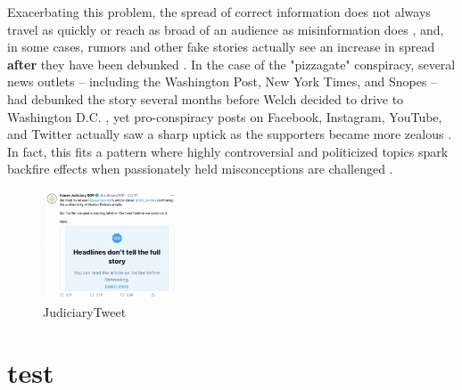 \documentclass[NETN,manuscript]{stjour-new}
\begin{document}
Exacerbating this problem, the spread of correct information does not always travel as quickly or reach as broad of an audience as misinformation does \citep{maddock2015characterizing, vosoughi2018spread}, and, in some cases, rumors and other fake stories actually see an increase in spread \textbf{after} they have been debunked \citep{starbird2014rumors}. In the case of the "pizzagate" conspiracy, several news outlets -- including the Washington Post, New York Times, and Snopes -- had debunked the story several months before Welch decided to drive to Washington D.C. \citep{kang2016fake,lacapria2016fact,board_2016}, yet pro-conspiracy posts on Facebook, Instagram, YouTube, and Twitter actually saw a sharp uptick as the supporters became more zealous \citep{kang2016washington}. In fact, this fits a pattern where highly controversial and politicized topics spark backfire effects when passionately held misconceptions are challenged \citep{gollust2009polarizing,nyhan2010corrections,nyhan2013hazards,redlawsk2010affective,schaffner2016misinformation}.


 \begin{figure}[htp]
    \centering
    \includegraphics[width=4cm]{JudiciaryTweet.png}
    \caption{JudiciaryTweet}
    \label{img:JudiciaryTweet}
\end{figure}



\section{test}






\newpage


\end{document}
